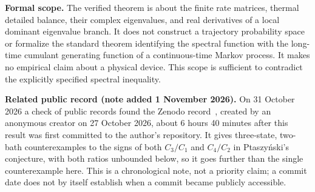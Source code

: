 \documentclass[11pt,a4paper]{article}
\begin{document}
\textbf{Formal scope.} The verified theorem is about the finite rate matrices, thermal detailed balance, their complex eigenvalues, and real derivatives of a local dominant eigenvalue branch. It does not construct a trajectory probability space or formalize the standard theorem identifying the spectral function with the long-time cumulant generating function of a continuous-time Markov process. It makes no empirical claim about a physical device. This scope is sufficient to contradict the explicitly specified spectral inequality.

\textbf{Related public record (note added 1 November 2026).} On 31 October 2026 a check of public records found the Zenodo record~\cite{zenodo2026}, created by an anonymous creator on 27 October 2026, about 6 hours 40 minutes after this result was first committed to the author's repository. It gives three-state, two-bath counterexamples to the signs of both $C_3/C_1$ and $C_4/C_2$ in Ptaszy\'nski's conjecture, with both ratios unbounded below, so it goes further than the single counterexample here. This is a chronological note, not a priority claim; a commit date does not by itself establish when a commit became publicly accessible.
\end{document}

